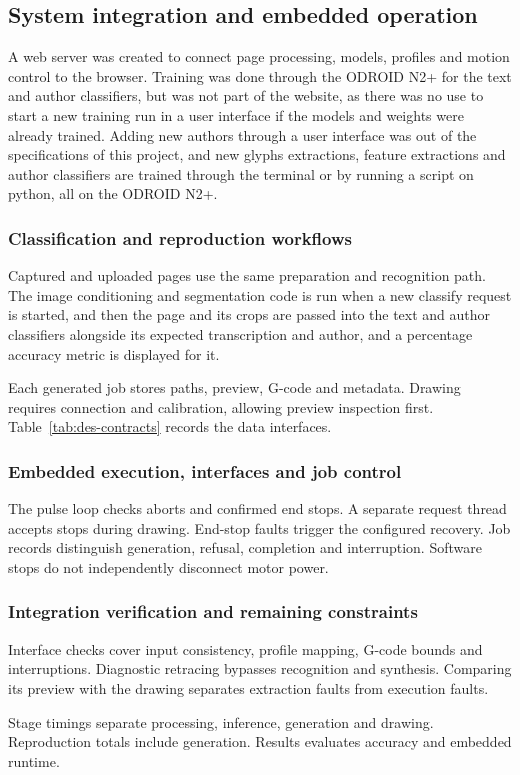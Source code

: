 \subsection{System integration and embedded operation}
\label{sec:des-integration}
A web server was created to connect page processing, models, profiles and motion control to the browser. Training was done through the ODROID N2+ for the text and author classifiers, but was not part of the website, as there was no use to start a new training run in a user interface if the models and weights were already trained. Adding new authors through a user interface was out of the specifications of this project, and new glyphs extractions, feature extractions and author classifiers are trained through the terminal or by running a script on python, all on the ODROID N2+.

\subsubsection{Classification and reproduction workflows}
Captured and uploaded pages use the same preparation and recognition path. The image conditioning and segmentation code is run when a new classify request is started, and then the page and its crops are passed into the text and author classifiers alongside its expected transcription and author, and a percentage accuracy metric is displayed for it.

Each generated job stores paths, preview, G-code and metadata. Drawing requires connection and calibration, allowing preview inspection first. Table~\ref{tab:des-contracts} records the data interfaces.

\subsubsection{Embedded execution, interfaces and job control}
The pulse loop checks aborts and confirmed end stops. A separate request thread accepts stops during drawing. End-stop faults trigger the configured recovery. Job records distinguish generation, refusal, completion and interruption. Software stops do not independently disconnect motor power.

\subsubsection{Integration verification and remaining constraints}
Interface checks cover input consistency, profile mapping, G-code bounds and interruptions. Diagnostic retracing bypasses recognition and synthesis. Comparing its preview with the drawing separates extraction faults from execution faults.

Stage timings separate processing, inference, generation and drawing. Reproduction totals include generation. Results evaluates accuracy and embedded runtime.
\FloatBarrier
